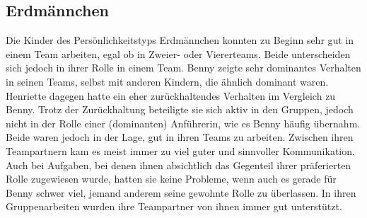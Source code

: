 \subsection*{Erdmännchen}
Die Kinder des Persönlichkeitstyps Erdmännchen konnten zu Beginn sehr gut in einem Team arbeiten, egal ob in Zweier- oder Viererteams. Beide unterscheiden sich jedoch in ihrer Rolle in einem Team. Benny zeigte sehr dominantes Verhalten in seinen Teams, selbst mit anderen Kindern, die ähnlich dominant waren. Henriette dagegen hatte ein eher zurückhaltendes Verhalten im Vergleich zu Benny. Trotz der Zurückhaltung beteiligte sie sich aktiv in den Gruppen, jedoch nicht in der Rolle einer (dominanten) Anführerin, wie es Benny häufig übernahm. Beide waren jedoch in der Lage, gut in ihren Teams zu arbeiten. Zwischen ihren Teampartnern kam es meist immer zu viel guter und sinnvoller Kommunikation. Auch bei Aufgaben, bei denen ihnen absichtlich das Gegenteil ihrer präferierten Rolle zugewiesen wurde, hatten sie keine Probleme, wenn auch es gerade für Benny schwer viel, jemand anderem seine gewohnte Rolle zu überlassen. In ihren Gruppenarbeiten wurden ihre Teampartner von ihnen immer gut unterstützt.

